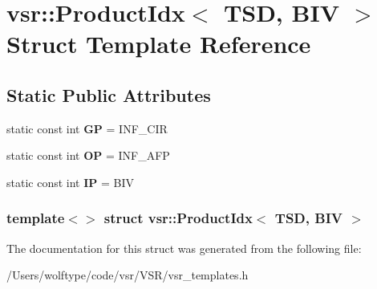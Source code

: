 \hypertarget{structvsr_1_1_product_idx_3_01_t_s_d_00_01_b_i_v_01_4}{\section{vsr\-:\-:Product\-Idx$<$ T\-S\-D, B\-I\-V $>$ Struct Template Reference}
\label{structvsr_1_1_product_idx_3_01_t_s_d_00_01_b_i_v_01_4}
}
\subsection*{Static Public Attributes}
\begin{DoxyCompactItemize}
\item 
\hypertarget{structvsr_1_1_product_idx_3_01_t_s_d_00_01_b_i_v_01_4_a3600ebb882c39aa5d36880d4cb7a1621}{static const int {\bfseries G\-P} = I\-N\-F\-\_\-\-C\-I\-R}\label{structvsr_1_1_product_idx_3_01_t_s_d_00_01_b_i_v_01_4_a3600ebb882c39aa5d36880d4cb7a1621}

\item 
\hypertarget{structvsr_1_1_product_idx_3_01_t_s_d_00_01_b_i_v_01_4_ac4bc5eae28f87572bc221f0c1b209843}{static const int {\bfseries O\-P} = I\-N\-F\-\_\-\-A\-F\-P}\label{structvsr_1_1_product_idx_3_01_t_s_d_00_01_b_i_v_01_4_ac4bc5eae28f87572bc221f0c1b209843}

\item 
\hypertarget{structvsr_1_1_product_idx_3_01_t_s_d_00_01_b_i_v_01_4_a8094687c35ffa5a0b8f3711cc7078af3}{static const int {\bfseries I\-P} = B\-I\-V}\label{structvsr_1_1_product_idx_3_01_t_s_d_00_01_b_i_v_01_4_a8094687c35ffa5a0b8f3711cc7078af3}

\end{DoxyCompactItemize}
\subsubsection*{template$<$$>$ struct vsr\-::\-Product\-Idx$<$ T\-S\-D, B\-I\-V $>$}



The documentation for this struct was generated from the following file\-:\begin{DoxyCompactItemize}
\item 
/\-Users/wolftype/code/vsr/\-V\-S\-R/vsr\-\_\-templates.\-h\end{DoxyCompactItemize}
